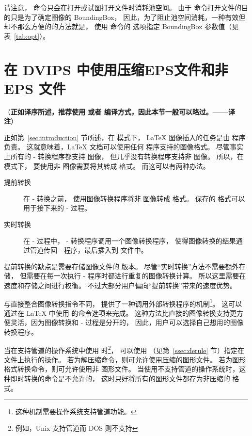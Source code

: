 请注意， 命令只会在打开或试图打开文件时消耗池空间。
由于  命令打开文件的目的只是为了确定图像的 BoundingBox，
因此，为了阻止池空间消耗，一种有效但却不那么方便的的方法就是，
使用  命令的  选项指定 BoundingBox 参数值（见表~\ref{tab:opt}）。


\section{在 DVIPS 中使用压缩EPS文件和非 EPS 文件}\label{sec:dvips-noneps}

（{\bfseries 正如译序所述，推荐使用 \XeTeX 或者 \pdfTeX 编译方式，因此本节一般可以略过。——译注}）

正如第~\ref{sec:introduction} 节所述，在  模式下，
\LaTeX{} 图像插入的任务是由  程序负责。
这就意味着，\LaTeX{} 文档可以使用任何  程序支持的图像格式。
尽管事实上所有的 - 转换程序都支持  图像，
但几乎没有转换程序支持非  图像。
所以，在  模式下，
要使用非  图像需要将其转成  格式。
而这可以有两种办法。
\begin{description}
	\item[提前转换] 在 - 转换之前，
	使用图像转换程序将非 图像转成 格式。
	保存的  格式可以用于接下来的 - 过程。
	
	\item[实时转换] 在 - 过程中，
	- 转换程序调用一个图像转换程序，
	使得图像转换的结果通过管道传回 - 程序，最后插入到  文件中。
\end{description}
提前转换的缺点是需要存储图像文件的  版本。
尽管“实时转换”方法不需要额外存储，
但需要在每一次执行 - 程序时都进行重复的图像转换计算。
所以这里需要在速度和存储之间进行权衡。
不过大部分用户偏向“提前转换”带来的速度优势。

与直接整合图像转换指令不同， 提供了一种调用外部转换程序的机制\footnote{
	这种机制需要操作系统支持管道功能。}。
这可以通过在 \LaTeX{} 中使用  的命令选项来完成。
这种方法比直接的图像转换支持更方便灵活，因为图像转换和 - 过程是分开的，
因此，用户可以选择自己想用的图像转换程序。

当在支持管道的操作系统中使用  时\footnote{
	例如，Unix 支持管道而 DOS 则不支持}，
可以使用  （见第~\ref{ssec:derule} 节）指定在文件上执行的操作。
若为解压缩命令，则可允许使用压缩的图形文件。
若为图形格式转换命令，则可允许使用非  图形文件。
当使用不支持管道的操作系统时，这种即时转换的命令是不允许的，
这时只好将所有的图形文件都存为非压缩的  格式。

